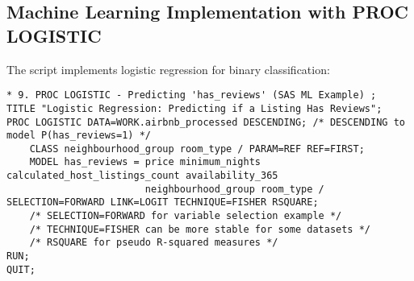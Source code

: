 \documentclass{article}
\begin{document}
\subsection{Machine Learning Implementation with PROC LOGISTIC}
The script implements logistic regression for binary classification:

\begin{lstlisting}[style=SASStyle, caption=Logistic Regression Implementation]
* 9. PROC LOGISTIC - Predicting 'has_reviews' (SAS ML Example) ;
TITLE "Logistic Regression: Predicting if a Listing Has Reviews";
PROC LOGISTIC DATA=WORK.airbnb_processed DESCENDING; /* DESCENDING to model P(has_reviews=1) */
    CLASS neighbourhood_group room_type / PARAM=REF REF=FIRST;
    MODEL has_reviews = price minimum_nights calculated_host_listings_count availability_365
                        neighbourhood_group room_type / SELECTION=FORWARD LINK=LOGIT TECHNIQUE=FISHER RSQUARE;
    /* SELECTION=FORWARD for variable selection example */
    /* TECHNIQUE=FISHER can be more stable for some datasets */
    /* RSQUARE for pseudo R-squared measures */
RUN;
QUIT;
\end{lstlisting}
\end{document}
